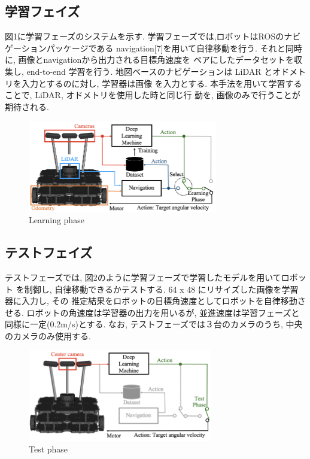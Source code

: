 \documentclass{jarticle}
\begin{document}
\subsection{学習フェイズ}
図1に学習フェーズのシステムを示す. 学習フェーズでは,ロボットはROSのナビゲーションパッケージである
navigation[7]を用いて自律移動を行う. それと同時に, 画像とnavigationから出力される目標角速度を
ペアにしたデータセットを収集し, end-to-end 学習を行う.
地図ベースのナビゲーションは LiDAR とオドメトリを入力とするのに対し, 学習器は画像
を入力とする. 本手法を用いて学習することで, LiDAR, オドメトリを使用した時と同じ行
動を, 画像のみで行うことが期待される. 


\begin{figure}[h!]
  \centering
   \includegraphics[height=40mm]{./figs/learning.png}
   \caption{Learning phase}
\end{figure}


\subsection{テストフェイズ}
テストフェーズでは, 図2のように学習フェーズで学習したモデルを用いてロボット
を制御し, 自律移動できるかテストする. 64 x 48 にリサイズした画像を学習器に入力し, その
推定結果をロボットの目標角速度としてロボットを自律移動させる.
ロボットの角速度は学習器の出力を用いるが, 並進速度は学習フェーズと同様に一定(0.2m/s)とする.
なお, テストフェーズでは３台のカメラのうち, 中央のカメラのみ使用する.

\begin{figure}[h!]
  \centering
   \includegraphics[height=40mm]{./figs/test.png}
   \caption{Test phase}
\end{figure}
\end{document}
